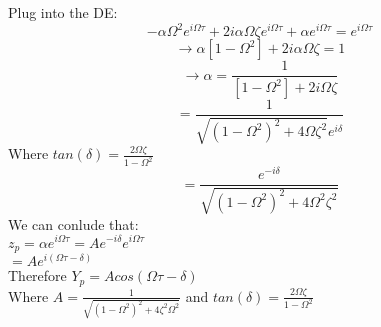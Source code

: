 \documentclass[12pt]{article}
\begin{document}
	Plug into the DE:\\
	$$-\alpha\Omega^2e^{i\Omega\tau} + 2i\alpha\Omega\zeta e^{i\Omega\tau} + \alpha e^{i\Omega\tau} = e^{i\Omega\tau}$$
	$$\rightarrow \alpha[1 - \Omega^2] + 2i \alpha \Omega \zeta = 1$$
	$$\rightarrow \alpha = \frac{1}{[1-\Omega^2] + 2i\Omega\zeta}$$
	$$ = \frac{1}{\sqrt{(1 - \Omega^2)^2 + 4\Omega\zeta^2}e^{i\delta}}$$
	Where $tan(\delta) = \frac{2\Omega\zeta}{1 - \Omega^2}$\\
	$$= \frac{e^{-i\delta}}{\sqrt{(1-\Omega^2)^2 + 4\Omega^2\zeta^2}}$$
	We can conlude that:\\
	$z_p = \alpha e^{i\Omega\tau} = Ae^{-i\delta}{e^{i\Omega\tau}}$\\
	$= Ae^{i(\Omega\tau - \delta)}$\\
	Therefore $Y_p = Acos(\Omega\tau - \delta)$\\
	Where $A = \frac{1}{\sqrt{(1-\Omega^2)^2 + 4\zeta^2\Omega^2}}$ and $tan(\delta) = \frac{2\Omega\zeta}{1-\Omega^2}$\\
	
	
	
	
\end{document}
